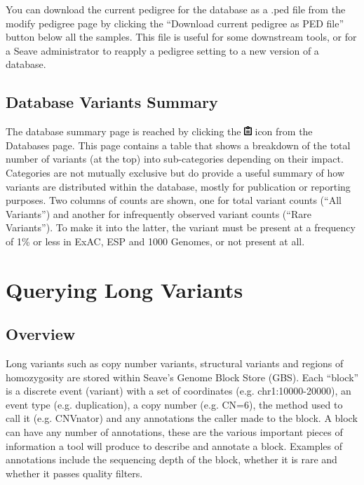 \documentclass[11pt, a4paper]{article}
\begin{document}
You can download the current pedigree for the database as a .ped file from the modify pedigree page by clicking the ``Download current pedigree as PED file'' button below all the samples. This file is useful for some downstream tools, or for a Seave administrator to reapply a pedigree setting to a new version of a database. 

\subsection{Database Variants Summary}\label{databaseSummary}

The database summary page is reached by clicking the \includegraphics[width=8pt]{clipboard_icon.png} icon from the Databases page. This page contains a table that shows a breakdown of the total number of variants (at the top) into sub-categories depending on their impact. Categories are not mutually exclusive but do provide a useful summary of how variants are distributed within the database, mostly for publication or reporting purposes. Two columns of counts are shown, one for total variant counts (``All Variants'') and another for infrequently observed variant counts (``Rare Variants''). To make it into the latter, the variant must be present at a frequency of 1\% or less in ExAC, ESP and 1000 Genomes, or not present at all.


\section{Querying Long Variants}\label{longVariantsQuery}

\subsection{Overview}

Long variants such as copy number variants, structural variants and regions of homozygosity are stored within Seave's Genome Block Store (GBS). Each ``block'' is a discrete event (variant) with a set of coordinates (e.g. chr1:10000-20000), an event type (e.g. duplication), a copy number (e.g. CN=6), the method used to call it (e.g. CNVnator) and any annotations the caller made to the block. A block can have any number of annotations, these are the various important pieces of information a tool will produce to describe and annotate a block. Examples of annotations include the sequencing depth of the block, whether it is rare and whether it passes quality filters. 
\end{document}
